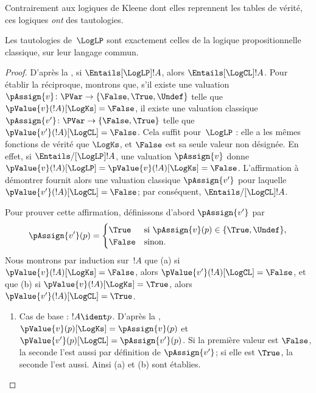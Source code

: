 \documentclass[../../../include/open-logic-section]{subfiles}
\begin{document}
Contrairement aux logiques de Kleene
dont elles reprennent les tables de
vérité, ces logiques \emph{ont} des
tautologies.

\begin{prop}
Les tautologies de~$\LogLP$ sont
exactement celles de la logique
propositionnelle classique, sur leur
langage commun.
\end{prop}

\begin{proof}
  D'après la ,
  si $\Entails[\LogLP] !A$, alors
  $\Entails[\LogCL] !A$. Pour établir
  la réciproque, montrons que, s'il
  existe une valuation
  $\pAssign{v}\colon\PVar\to
  \{\False,\True,\Undef\}$ telle que
  $\pValue{v}(!A)[\LogKs]=\False$,
  il existe une valuation classique
  $\pAssign{v'}\colon\PVar\to
  \{\False,\True\}$ telle que
  $\pValue{v'}(!A)[\LogCL]=\False$.
  Cela suffit pour~$\LogLP$ : elle a
  les mêmes fonctions de vérité que
  $\LogKs$, et $\False$ est sa seule
  valeur non désignée. En effet, si
  $\Entails/[\LogLP] !A$, une valuation
  $\pAssign{v}$ donne
  $\pValue{v}(!A)[\LogLP]
  =\pValue{v}(!A)[\LogKs]=\False$.
  L'affirmation à démontrer fournit
  alors une valuation classique
  $\pAssign{v'}$ pour laquelle
  $\pValue{v'}(!A)[\LogCL]=\False$;
  par conséquent,
  $\Entails/[\LogCL] !A$.

  Pour prouver cette affirmation,
  définissons d'abord $\pAssign{v'}$
  par
  \[
    \pAssign{v'}(p)=
    \begin{cases}
      \True & \text{si }\pAssign{v}(p)
        \in\{\True,\Undef\},\\
      \False & \text{sinon.}
    \end{cases}
  \]
  Nous montrons par induction sur~$!A$
  que (a) si
  $\pValue{v}(!A)[\LogKs]=\False$,
  alors
  $\pValue{v'}(!A)[\LogCL]=\False$,
  et que (b) si
  $\pValue{v}(!A)[\LogKs]=\True$,
  alors
  $\pValue{v'}(!A)[\LogCL]=\True$.
  \begin{enumerate}
    \item Cas de base : $!A\ident p$.
    D'après la ,
    $\pValue{v}(p)[\LogKs]
    =\pAssign{v}(p)$ et
    $\pValue{v'}(p)[\LogCL]
    =\pAssign{v'}(p)$. Si la première
    valeur est $\False$, la seconde
    l'est aussi par définition de
    $\pAssign{v'}$; si elle est
    $\True$, la seconde l'est aussi.
    Ainsi (a) et (b) sont établies.


\end{enumerate}
\end{proof}
\end{document}
